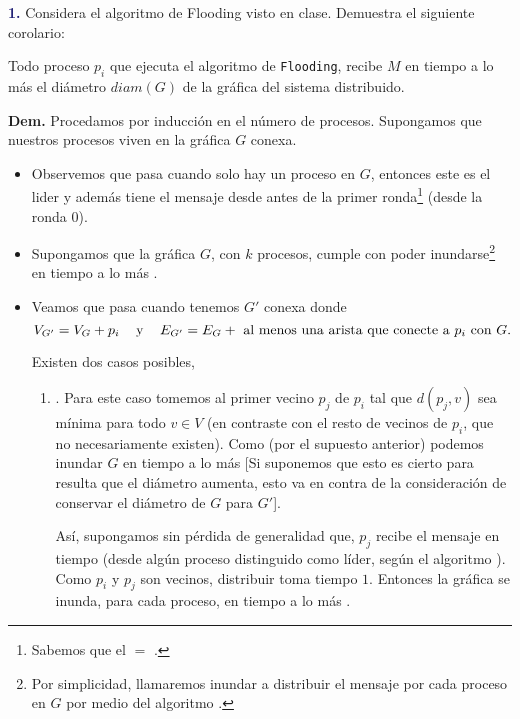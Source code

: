 \newpage
\textbf{\textcolor{MidnightBlue}{1.}}
Considera el algoritmo de Flooding visto en clase.
Demuestra el siguiente corolario:                                                        

Todo proceso $p_i$ que ejecuta el algoritmo de
{\tt Flooding}, recibe $M$ en tiempo a lo más el
diámetro $diam(G)$ de la gráfica del sistema
distribuido.

\textbf{Dem.} Procedamos por inducción en el número
de procesos. Supongamos que nuestros procesos viven
en la gráfica $G$ conexa.
\begin{itemize}
\item Observemos que pasa cuando solo hay un proceso en $G$,
      entonces este es el lider y además tiene el mensaje
       desde antes de la primer ronda\footnote{Sabemos
      que el  $=$ .} (desde la ronda 0).
\item Supongamos que la gráfica $G$, con $k$ procesos, cumple
      con poder inundarse\footnote{Por simplicidad, llamaremos
      inundar a distribuir el mensaje  por cada proceso
      en $G$ por medio del algoritmo .} en tiempo
      a lo más .
\item Veamos que pasa cuando tenemos $G'$ conexa donde
      \[V_{G'} = V_G + p_i \hspace*{0.3cm} \text{ y } \hspace*{0.3cm}
      E_{G'} = E_G + \text{ al menos una arista que conecte a $p_i$
      con $G$.}\]
      
      Existen dos casos posibles,
      \begin{enumerate}
      \item {}. Para este caso tomemos al primer
      vecino $p_j$ de $p_i$ tal que $d(p_j, v)$ sea mínima para todo
      $v \in V$ (en contraste con el resto de vecinos de $p_i$, que no
      necesariamente existen). Como (por el supuesto anterior) podemos
      inundar $G$ en tiempo a lo más  [Si suponemos
      que esto es cierto para  resulta que el diámetro
      aumenta, esto va en contra de la consideración de conservar el
      diámetro de $G$ para $G'$].

      Así, supongamos sin pérdida de generalidad que, $p_j$ recibe el
      mensaje  en tiempo  (desde algún proceso
      distinguido como líder, según el algoritmo ). Como
      $p_i$ y $p_j$ son vecinos, distribuir  toma tiempo $1$.
      Entonces la gráfica se inunda, para cada proceso, en tiempo a lo más
      .
      

\end{enumerate}
\end{itemize}
